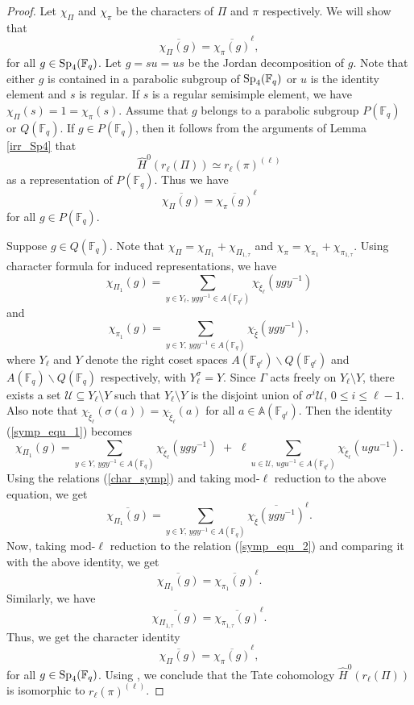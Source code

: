 \documentclass[10pt, reqno]{amsart}
\theoremstyle{plain}
\numberwithin{equation}{section} \newcommand{\di}{\operatorname{dim}}
\begin{document}
\begin{proof}
Let $\chi_\Pi$ and $\chi_\pi$ be the 
characters of $\Pi$ and $\pi$ respectively. 
We will show that 
$$ \overline{\chi_\Pi(g)} = 
\overline{\chi_\pi(g)}^\ell, $$ for all
$g\in {\rm Sp}_4(\mathbb{F}_q)$.  Let $g=su=us$ be the Jordan
decomposition of $g$.  Note that either $g$ is contained in a
parabolic subgroup of ${\rm Sp}_4(\mathbb{F}_q)$ or $u$ is the
identity element and $s$ is regular.  If $s$ is a regular semisimple
element, we have $\chi_\Pi(s) = 1 = \chi_\pi(s)$.  Assume that $g$
belongs to a parabolic subgroup $P(\mathbb{F}_q)$ or
$Q(\mathbb{F}_q)$.  If $g\in P(\mathbb{F}_q)$, then it follows from
the arguments of Lemma \ref{irr_Sp4} that
$$ \widehat{H}^0(r_\ell(\Pi)) 
\simeq r_\ell(\pi)^{(\ell)} $$
as a representation of $P(\mathbb{F}_q)$. 
Thus we have
$$ \overline{\chi_\Pi(g)} =
\overline{\chi_\pi(g)}^\ell $$
for all $g\in P(\mathbb{F}_q)$. 

Suppose $g\in Q(\mathbb{F}_q)$. Note that
$\chi_\Pi = \chi_{\Pi_1} + \chi_{\Pi_{1,\tau}}$ and 
$\chi_\pi = \chi_{\pi_1} + \chi_{\pi_{1,\tau}}$.
Using character formula for 
induced representations, we have
\begin{equation}\label{symp_equ_1}
\chi_{\Pi_1}(g) = \sum_{y\in Y_\ell,\,ygy^{-1}\in A(\mathbb{F}_{q^\ell})}
\chi_{\widetilde{\xi}_\ell}(ygy^{-1})
\end{equation}
and
\begin{equation}\label{symp_equ_2}
\chi_{\pi_1}(g) = \sum_{y\in Y,\,ygy^{-1}\in
A(\mathbb{F}_q)}\chi_{\widetilde{\xi}}(ygy^{-1}),
\end{equation}
where $Y_\ell$ and $Y$ denote the right coset spaces
$A(\mathbb{F}_{q^\ell})\backslash Q(\mathbb{F}_{q^\ell})$ and
$A(\mathbb{F}_q) \backslash Q(\mathbb{F}_q)$ respectively, with
$Y_\ell^\sigma = Y$.  Since $\Gamma$ acts freely on
$Y_\ell\setminus Y$, there exists a set
$\mathcal{U}\subseteq Y_\ell\setminus Y$ such that $Y_\ell\setminus Y$
is the disjoint union of $\sigma^i\mathcal{U}$, $0\leq i\leq
\ell-1$. Also note that
$\chi_{\widetilde{\xi}_\ell}(\sigma(a)) =
\chi_{\widetilde{\xi}_\ell}(a)$ for all
$a\in\mathbb{A}(\mathbb{F}_{q^\ell})$. Then the identity
(\ref{symp_equ_1}) becomes
$$  \chi_{\Pi_1}(g) = \sum_{y\in Y,\,
ygy^{-1}\in A(\mathbb{F}_{q})}
\chi_{\widetilde{\xi}_\ell}(ygy^{-1})\,\,+\,\,
\ell\sum_{u\in\mathcal{U},\,ugu^{-1}\in
A(\mathbb{F}_{q^\ell})}
\chi_{\widetilde{\xi}_\ell}(ugu^{-1}). $$
Using the relations (\ref{char_symp})
and taking mod-$\ell$ reduction to the
above equation, we get
$$ \overline{\chi_{\Pi_1}(g)} = \sum_{y\in Y,\,
  ygy^{-1}\in A(\mathbb{F}_{q})}
\overline{\chi_{\widetilde{\xi}}(ygy^{-1})}^\ell. $$ Now, taking
mod-$\ell$ reduction to the relation (\ref{symp_equ_2}) and comparing
it with the above identity, we get
$$ \overline{\chi_{\Pi_1}(g)} =
\overline{\chi_{\pi_1}(g)}^\ell. $$
Similarly, we have
$$ \overline{\chi_{\Pi_{1,\tau}}(g)} =\overline{\chi_{\pi_{1,\tau}}(g)}^\ell. $$
Thus, we get the character identity
$$ \overline{\chi_\Pi(g)} =
\overline{\chi_\pi(g)}^\ell, $$ for all
$g\in {\rm Sp}_4(\mathbb{F}_q)$. Using \cite[Corollary
7.21]{Lam_noncommutative_rings}, we conclude that the Tate cohomology
$\widehat{H}^0(r_\ell(\Pi))$ is isomorphic to $r_\ell(\pi)^{(\ell)}$.


\end{proof}
\end{document}
